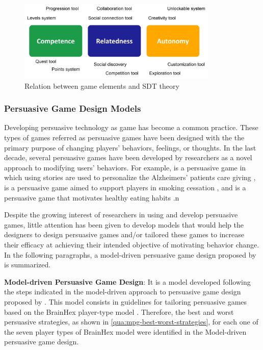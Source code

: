 \begin{figure}[htb]
 \caption{Relation between game elements and SDT theory}
 \label{fig:sdt-game-elements}
 \centering
 \includegraphics[width=0.85\textwidth]{images/chap-general-background/sdt-game-elements.png}
 \fautor
\end{figure}


\subsubsection{Persuasive Game Design Models}
\label{subsub:persuasive-game-design-models}

Developing persuasive technology as game has become a common practice.
These types of games referred as persuasive games have been designed with the the primary purpose of changing  players' behaviors, feelings, or thoughts.
In the last decade, several persuasive games have been developed by researchers as a novel approach to modifying users' behaviors.
For example,  is a persuasive game in which using stories are used to personalize the Alzheimers' patients care giving \cite{CadamuroVisch2013},  is a persuasive game aimed to support players in smoking cessation \cite{KhaledBarrNobleFischerBiddle2007}, and  is a persuasive
game that motivates healthy eating habits \cite{GrimesKantrooGrinter2010}.n

Despite the growing interest of researchers in using and develop persuasive games, little attention has been given to develop models that would help the designers to design persuasive games and/or tailored these games to increase their efficacy at achieving their intended objective of motivating behavior change.
In the following paragraphs, a model-driven persuasive game design proposed by \cite{OrjiVassilevaMandryk2014} is summarized.

\textbf{Model-driven Persuasive Game Design}:
It is a model developed following the steps indicated in the model-driven approach to persuasive game design proposed by \cite{Orji2014}.
This model consists in guidelines for tailoring persuasive games based on the BrainHex player-type model \cite{NackeBatemanMandryk2014}.
Therefore, the best and worst persuasive strategies, as shown in \autoref{qua:mpg-best-worst-strategies}, for each one of the seven player types of BrainHex model were identified in the Model-driven persuasive game design.



